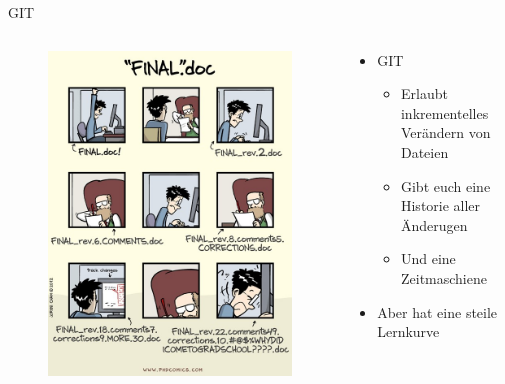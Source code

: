 \begin{frame}{GIT}
    \begin{columns}
        \begin{column}{0.4\textwidth}
            \begin{flushleft}
                \begin{figure}
                    \includegraphics[height=0.8\textheight]{graphics/final.jpg}
                \end{figure}    
            \end{flushleft}            
        \end{column}
        \begin{column}[t]{0.6\textwidth}
            \pause
            \vspace{-4cm}
            \begin{itemize}[]
                \item GIT
                \begin{itemize}
                    \item Erlaubt inkrementelles Verändern von Dateien
                    \item Gibt euch eine Historie aller Änderugen
                    \item Und eine Zeitmaschiene
                \end{itemize}
                \item Aber hat eine steile Lernkurve
            \end{itemize}
            
        \end{column}
    \end{columns}
\end{frame}
